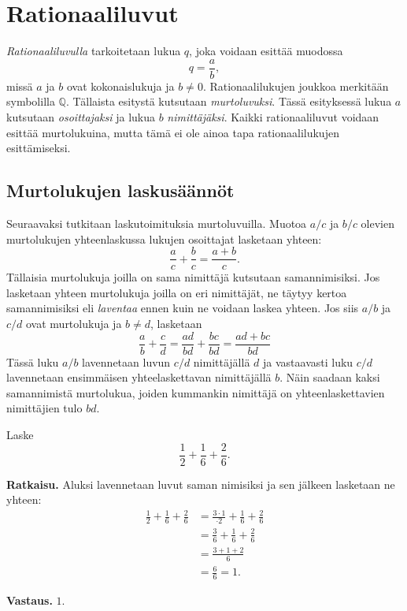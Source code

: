 \chapter{Rationaaliluvut}
    \label{rationaaliluvut}
    
    \emph{Rationaaliluvulla} tarkoitetaan lukua $q$, joka voidaan esittää muodossa
    \[
    q=\frac{a}{b}, 
    \]
    missä $a$ ja $b$ ovat kokonaislukuja ja $b\neq 0$. Rationaalilukujen joukkoa
    merkitään symbolilla $\mathbb{Q}$. Tällaista esitystä kutsutaan
    \emph{murtoluvuksi}. Tässä esityksessä lukua $a$ kutsutaan \emph{osoittajaksi}
    ja lukua $b$ \emph{nimittäjäksi}. Kaikki rationaaliluvut voidaan esittää
    murtolukuina, mutta tämä ei ole ainoa tapa rationaalilukujen esittämiseksi. 
    

\section{Murtolukujen laskusäännöt}

    Seuraavaksi tutkitaan laskutoimituksia murtoluvuilla. Muotoa $a/c$ ja $b/c$
    olevien murtolukujen yhteenlaskussa lukujen osoittajat lasketaan yhteen:
    \[
    \frac{a}{c} + \frac{b}{c} = \frac{a+b}{c}.
    \]
    Tällaisia murtolukuja joilla on sama nimittäjä kutsutaan samannimisiksi. Jos
    lasketaan yhteen murtolukuja joilla on eri nimittäjät, ne täytyy kertoa
    samannimisiksi eli \emph{laventaa} ennen kuin ne voidaan laskea yhteen.
    Jos siis $a/b$ ja $c/d$ ovat murtolukuja ja $b\neq d$, lasketaan
    \[
    \frac{a}{b} + \frac{c}{d} = \frac{ad}{bd} + \frac{bc}{bd} = \frac{ad+bc}{bd}
    \]
    Tässä luku $a/b$ lavennetaan luvun $c/d$ nimittäjällä $d$ ja vastaavasti luku
    $c/d$ lavennetaan ensimmäisen yhteelaskettavan nimittäjällä $b$. Näin saadaan
    kaksi samannimistä murtolukua, joiden kummankin nimittäjä on yhteenlaskettavien
    nimittäjien tulo $bd$.
    
    \begin{esimerkki}
        Laske
        \[
        \frac{1}{2} + \frac{1}{6} + \frac{2}{6}.
        \]
        
        \textbf{Ratkaisu.}
        Aluksi lavennetaan luvut saman nimisiksi ja sen jälkeen lasketaan ne yhteen:
        \begin{eqnarray*}
            \frac{1}{2} + \frac{1}{6} + \frac{2}{6}
            &=
            \frac{3\cdot 1}{\cdot 2} + \frac{1}{6} + \frac{2}{6}\\
            &=
            \frac{3}{6} + \frac{1}{6} + \frac{2}{6}\\
            &= \frac{3+1+2}{6}\\ &= \frac{6}{6} = 1.
        \end{eqnarray*}
        
        \textbf{Vastaus.} $1$.
    
    \end{esimerkki}
    
